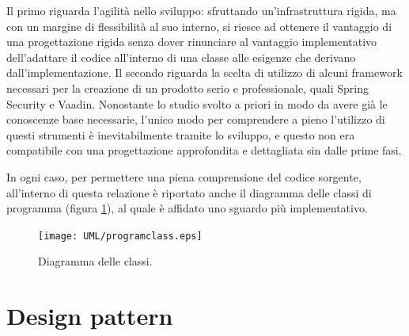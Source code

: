 Il primo riguarda l'agilità nello sviluppo: sfruttando un'infrastruttura rigida, ma con un margine di flessibilità al suo interno, si riesce ad ottenere il vantaggio di una progettazione rigida senza dover rinunciare al vantaggio implementativo dell'adattare il codice all'interno di una classe alle esigenze che derivano dall'implementazione.
Il secondo riguarda la scelta di utilizzo di alcuni framework necessari per la creazione di un prodotto serio e professionale, quali Spring Security e Vaadin. Nonostante lo studio svolto a priori in modo da avere già le conoscenze base necessarie, l'unico modo per comprendere a pieno l'utilizzo di questi strumenti è inevitabilmente tramite lo sviluppo, e questo non era compatibile con una progettazione approfondita e dettagliata sin dalle prime fasi.

In ogni caso, per permettere una piena comprensione del codice sorgente, all'interno di questa relazione è riportato anche il diagramma delle classi di programma (figura \ref{fig:programclassdiag}), al quale è affidato uno sguardo più implementativo.

\begin{figure}[ht]
	\centering
	\texttt{[image: UML/programclass.eps]}
	\caption{Diagramma delle classi.}
	\label{fig:programclassdiag}
\end{figure}


\section{Design pattern}\label{pattern}


